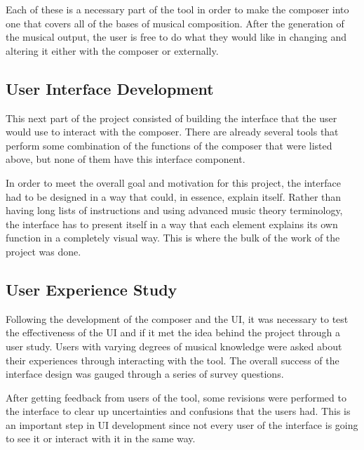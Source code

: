 \vspace{\baselineskip}

Each of these is a necessary part of the tool in order to make the composer into one that covers all of the bases of musical composition.  After the generation of the musical output, the user is free to do what they would like in changing and altering it either with the composer or externally.

\subsection{User Interface Development}
\label{subsec:userinterfacedevelopment}

This next part of the project consisted of building the interface that the user would use to interact with the composer.  There are already several tools that perform some combination of the functions of the composer that were listed above, but none of them have this interface component.

\vspace{\baselineskip}

In order to meet the overall goal and motivation for this project, the interface had to be designed in a way that could, in essence, explain itself.  Rather than having long lists of instructions and using advanced music theory terminology, the interface has to present itself in a way that each element explains its own function in a completely visual way.  This is where the bulk of the work of the project was done.

\subsection{User Experience Study}
\label{subsec:userexperiencestudy}

Following the development of the composer and the UI, it was necessary to test the effectiveness of the UI and if it met the idea behind the project through a user study.   Users with varying degrees of musical knowledge were asked about their experiences through interacting with the tool.  The overall success of the interface design was gauged through a series of survey questions.

\vspace{\baselineskip}

After getting feedback from users of the tool, some revisions were performed to the interface to clear up uncertainties and confusions that the users had.  This is an important step in UI development since not every user of the interface is going to see it or interact with it in the same way.

